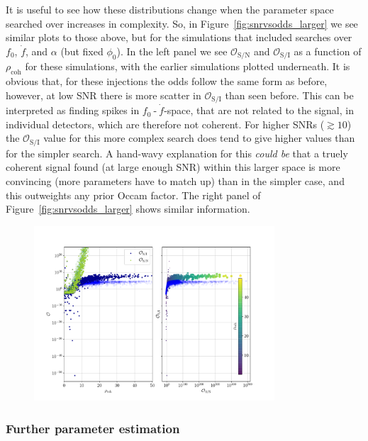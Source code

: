 It is useful to see how these distributions change when the parameter space searched over increases in complexity. So, in Figure~\ref{fig:snrvsodds_larger}
we see similar plots to those above, but for the simulations that included searches over $f_0$, $\dot{f}$, and $\alpha$ (but fixed $\phi_0$). In the left
panel we see $\mathcal{O}_{\text{S}/\text{N}}$ and $\mathcal{O}_{\text{S}/\text{I}}$ as a function of $\rho_{\text{coh}}$ for these simulations, with the
earlier simulations plotted underneath. It is obvious that, for these injections the odds follow the same form as before, however, at low SNR there
is more scatter in $\mathcal{O}_{\text{S}/\text{I}}$ than seen before. This can be interpreted as finding spikes in $f_0\operatorname{-}\dot{f}$-space, that
are not related to the signal, in individual detectors, which are therefore not coherent. For higher SNRs ($\gtrsim 10$) the $\mathcal{O}_{\text{S}/\text{I}}$
value for
this more complex search does tend to give higher values than for the simpler search. A hand-wavy explanation for this {\it could be} that a truely coherent signal
found (at large enough SNR) within this larger space is more convincing (more parameters have to match up) than in the simpler case, and this outweights any
prior Occam factor. The right panel of Figure~\ref{fig:snrvsodds_larger} shows similar information.

\begin{figure}[phtb]
\begin{center}
\includegraphics[width=0.8\textwidth]{./figures/codeeval/stats/snr_vs_odds_larger/snr_v_odds_larger_plot}
\caption{ \protect}
\end{center}
\end{figure}

\subsubsection{Further parameter estimation}

